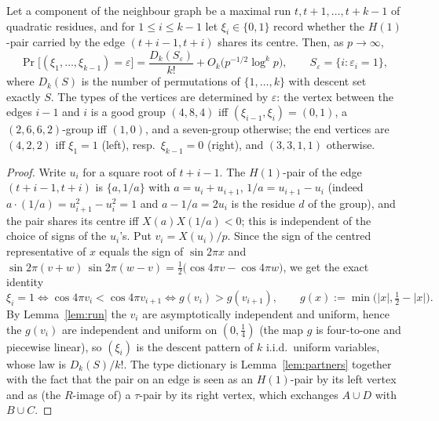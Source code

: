 \begin{proposition}\label{prop:descent}
Let a component of the neighbour graph be a maximal run $t,t+1,\dots,t+k-1$ of quadratic residues, and for $1\le i\le k-1$ let
$\xi_i\in\{0,1\}$ record whether the $H(1)$-pair carried by the edge $(t+i-1,t+i)$ shares its centre.  Then, as $p\to\infty$,
\[
 \Pr\bigl[(\xi_1,\dots,\xi_{k-1})=\varepsilon\bigr]=\frac{D_k(S_\varepsilon)}{k!}+O_k\bigl(p^{-1/2}\log^kp\bigr),\qquad
 S_\varepsilon=\{i:\varepsilon_i=1\},
\]
where $D_k(S)$ is the number of permutations of $\{1,\dots,k\}$ with descent set exactly $S$.  The types of the vertices are determined by
$\varepsilon$: the vertex between the edges $i-1$ and $i$ is a good group $(4,8,4)$ iff $(\xi_{i-1},\xi_i)=(0,1)$, a $(2,6,6,2)$-group iff
$(1,0)$, and a seven-group otherwise; the end vertices are $(4,2,2)$ iff $\xi_1=1$ (left), resp.\ $\xi_{k-1}=0$ (right), and $(3,3,1,1)$ otherwise.
\end{proposition}
\begin{proof}
Write $u_i$ for a square root of $t+i-1$.  The $H(1)$-pair of the edge $(t+i-1,t+i)$ is $\{a,1/a\}$ with
$a=u_i+u_{i+1}$, $1/a=u_{i+1}-u_i$ (indeed $a\cdot(1/a)=u_{i+1}^2-u_i^2=1$ and $a-1/a=2u_i$ is the residue $d$ of the group), and the pair
shares its centre iff $X(a)X(1/a)<0$; this is independent of the choice of signs of the $u_i$'s.  Put $v_i=X(u_i)/p$.  Since the sign of the
centred representative of $x$ equals the sign of $\sin2\pi x$ and
$\sin2\pi(v+w)\,\sin2\pi(w-v)=\tfrac12\bigl(\cos4\pi v-\cos4\pi w\bigr)$, we get the exact identity
\[
 \xi_i=1\iff\cos4\pi v_i<\cos4\pi v_{i+1}\iff g(v_i)>g(v_{i+1}),\qquad g(x):=\min\bigl(|x|,\tfrac12-|x|\bigr).
\]
By Lemma~\ref{lem:run} the $v_i$ are asymptotically independent and uniform, hence the $g(v_i)$ are independent and uniform on $(0,\frac14)$
(the map $g$ is four-to-one and piecewise linear), so $(\xi_i)$ is the descent pattern of $k$ i.i.d.\ uniform variables, whose law is
$D_k(S)/k!$.  The type dictionary is Lemma~\ref{lem:partners} together with the fact that the pair on an edge is seen as an
$H(1)$-pair by its left vertex and as (the $R$-image of) a $\tau$-pair by its right vertex, which exchanges $A\cup D$ with $B\cup C$.
\end{proof}

